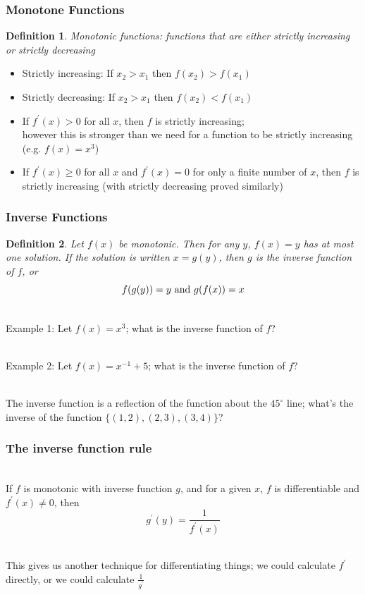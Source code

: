 \documentclass[aspectratio=169]{beamer}
\newtheorem{defn}{Definition}
\numberwithin{equation}{section}
\begin{document}
\begin{frame}
\frametitle{Monotone Functions}

\begin{defn}
Monotonic functions: functions that are either \textit{strictly increasing} or \textit{strictly decreasing}
\end{defn} \pause

\begin{itemize}
\item Strictly increasing: If $x_2>x_1$ then $f(x_2)>f(x_1)$
\item Strictly decreasing: If $x_2>x_1$ then $f(x_2)<f(x_1)$ \pause
\item If $f^\prime(x)>0$ for all $x$, then $f$ is strictly increasing; \\however this is stronger than we need for a function to be strictly increasing (e.g. $f(x)=x^3$)
\item If $f^\prime(x)\geq 0$ for all $x$ and $f^\prime(x)=0$ for only a finite number of $x$, then $f$ is strictly increasing (with strictly decreasing proved similarly)
\end{itemize}

\end{frame}



\begin{frame}
\frametitle{Inverse Functions}

\begin{defn}
Let $f(x)$ be monotonic.  Then for any $y$, $f(x)=y$ has at most one solution. If the solution is written $x=g(y)$, then $g$ is the \textit{inverse function} of $f$, or $$f(g(y))=y \hbox{ and }g(f(x))=x$$
\end{defn} \pause

\ \\Example 1:  Let $f(x)=x^3$; what is the inverse function of $f$? \pause

\ \\Example 2: Let $f(x)=x^{-1}+5$; what is the inverse function of $f$? \pause

\ \\The inverse function is a reflection of the function about the $45^\circ$ line; what's the inverse of the function $\{(1, 2),(2, 3), (3, 4)\}$?

\end{frame}



\begin{frame}
\frametitle{The inverse function rule}

\ \\If $f$ is monotonic with inverse function $g$, and for a given $x$, $f$ is differentiable and $f^\prime(x)\not=0$, then $$g^\prime(y) = \frac{1}{f^\prime(x)}$$ \pause


\ \\This gives us another technique for differentiating things; we could calculate $f^\prime$ directly, or we could calculate $\frac{1}{g^\prime}$

\end{frame}
\end{document}
